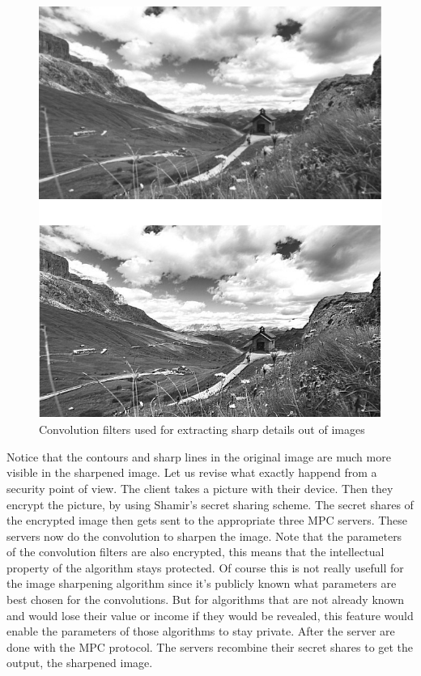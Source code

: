 \begin{figure}[H]
  \includegraphics[scale=0.5]{fig/sharpened_image.png}
  \centering
  \caption{Convolution filters used for extracting sharp details out of images}
  \label{fig:sharpened_image}
\end{figure}

Notice that the contours and sharp lines in the original image are much more visible in the sharpened image. Let us revise what exactly happend from a security point of view. The client takes a picture with their device. Then they encrypt the picture, by using Shamir's secret sharing scheme. The secret shares of the encrypted image then gets sent to the appropriate three MPC servers. These servers now do the convolution to sharpen the image. Note that the parameters of the convolution filters are also encrypted, this means that the intellectual property of the algorithm stays protected. Of course this is not really usefull for the image sharpening algorithm since it's publicly known what parameters are best chosen for the convolutions. But for algorithms that are not already known and would lose their value or income if they would be revealed, this feature would enable the parameters of those algorithms to stay private. After the server are done with the MPC protocol. The servers recombine their secret shares to get the output, the sharpened image.

